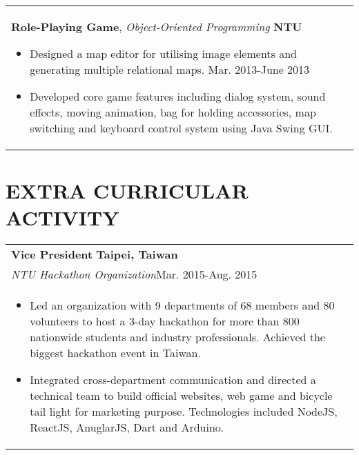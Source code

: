 \documentclass[a4paper,10pt]{article} %
\begin{document}
{\begin{tabular}{p{18.5cm}}
{\fontsize{11}{13.2}\textbf{Role-Playing Game}}, {\it{Object-Oriented Programming}} \hfill \textbf{NTU} 
\vspace{0.5mm}
\begin{itemize}
\item Designed a map editor for utilising image elements and generating multiple relational maps.  \hfill Mar. 2013-June 2013
\item Developed core game features including dialog system, sound effects, moving animation, bag for holding accessories, map switching and keyboard control system using Java Swing GUI.\vspace*{-\baselineskip}
\end{itemize}\\
\end{tabular}

\section{\textbf{EXTRA CURRICULAR ACTIVITY}}
\begin{tabular}{p{18.5cm}}
{\fontsize{11}{13.2}\textbf{Vice President}} \hfill \textbf{Taipei, Taiwan}\\ %
{\it NTU Hackathon Organization}\hfill Mar. 2015-Aug. 2015\\ %
\begin{itemize}
\vspace{-2mm}
\item Led an organization with 9 departments of 68 members and 80 volunteers to host a 3-day hackathon for more than 800 nationwide students and industry professionals. Achieved the biggest hackathon event in Taiwan.
\item Integrated cross-department communication and directed a technical team to build official websites, web game and bicycle tail light for marketing purpose. Technologies included NodeJS, ReactJS, AnuglarJS, Dart and Arduino.\vspace*{-\baselineskip}
\end{itemize}\\
\end{tabular}


}
\end{document}
